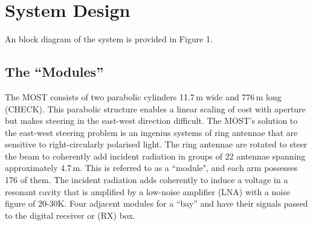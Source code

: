\section{System Design}

An block diagram of the system is provided in Figure 1.

\subsection{The ``Modules''}
The MOST consists of two parabolic cylinders 11.7\,m wide and 776\,m long (CHECK). This parabolic structure enables a linear scaling of cost with aperture but makes steering in the east-west direction difficult. The MOST's solution to the east-west steering problem is an ingenius systems of ring antennae that are sensitive to right-circularly polarised light. The ring antennae are rotated to steer the beam to coherently add incident radiation in groups of 22 antennae spanning approximately 4.7\,m. This is referred to as a ``module", and each arm possesses 176 of them.
The incident radiation adds coherently to induce a voltage in a resonant cavity that is amplified by a low-noise amplifier (LNA) with a noise figure of 20-30K. Four adjacent modules for a ``bay'' and have their signals passed to the digital receiver or (RX) box.
